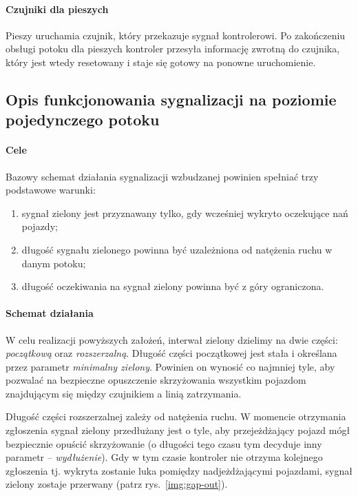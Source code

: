 \documentclass{pracamgr}
\newcommand{\imgr}[1]{rys.~\ref{#1}}
\theoremstyle{plain}
\begin{document}
\paragraph{Czujniki dla pieszych} Pieszy uruchamia czujnik, który
przekazuje sygnał kontrolerowi. Po zakończeniu obsługi potoku dla
pieszych kontroler przesyła informację zwrotną do czujnika, który jest
wtedy resetowany i staje się gotowy na ponowne uruchomienie.

\subsection{Opis funkcjonowania sygnalizacji na poziomie pojedynczego
potoku}
\label{ss:schemat}

\paragraph{Cele} Bazowy schemat działania sygnalizacji wzbudzanej
powinien spełniać trzy podstawowe warunki:
\begin{enumerate}
  \item sygnał zielony jest przyznawany tylko, gdy wcześniej wykryto
oczekujące nań pojazdy;
  \item długość sygnału zielonego powinna być uzależniona od natężenia
ruchu w danym potoku;
  \item długość oczekiwania na sygnał zielony powinna być z góry
ograniczona.
\end{enumerate}

\paragraph{Schemat działania} W celu realizacji powyższych założeń,
interwał zielony dzielimy na dwie części: \emph{początkową} oraz
\emph{rozszerzalną}. Długość części początkowej jest stała i określana
przez parametr \emph{minimalny zielony}. Powinien on wynosić co
najmniej tyle, aby pozwalać na bezpieczne opuszczenie skrzyżowania
wszystkim pojazdom znajdującym się między czujnikiem a linią
zatrzymania.

Długość części rozszerzalnej zależy od natężenia ruchu. W momencie
otrzymania zgłoszenia sygnał zielony przedłużany jest o tyle, aby
przejeżdżający pojazd mógł bezpiecznie opuścić skrzyżowanie (o
długości tego czasu tym decyduje inny parametr --
\emph{wydłużenie}). Gdy w tym czasie kontroler nie otrzyma kolejnego
zgłoszenia tj. wykryta zostanie luka pomiędzy nadjeżdżającymi
pojazdami, sygnał zielony zostaje przerwany (patrz
\imgr{img:gap-out}).
\end{document}
